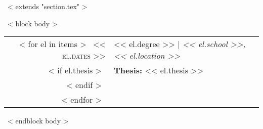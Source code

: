 ~< extends "section.tex" >~

~< block body >~

\begin{tabular}{r|p{11cm}}
    ~< for el in items >~
        \textsc{<< el.dates >>} & << el.degree >> | \emph{<< el.school >>, << el.location >>}\\
        ~< if el.thesis >~&\textbf{Thesis:} \footnotesize{<< el.thesis >>}\\~< endif >~\multicolumn{2}{c}{}\\
    ~< endfor >~
\end{tabular}

~< endblock body >~
